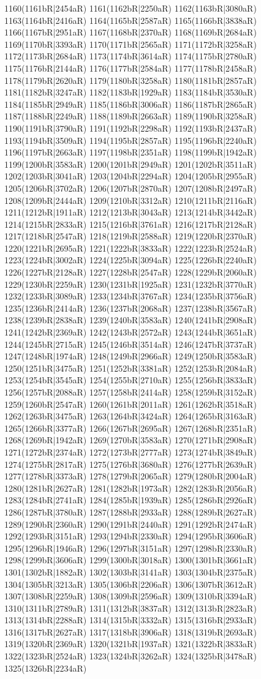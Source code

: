 1160(1161bR|2454aR) 1161(1162bR|2250aR) 1162(1163bR|3080aR) 1163(1164bR|2416aR) 1164(1165bR|2587aR) 1165(1166bR|3838aR) 1166(1167bR|2951aR) 1167(1168bR|2370aR) 1168(1169bR|2684aR) 1169(1170bR|3393aR) 1170(1171bR|2565aR) 1171(1172bR|3258aR) 1172(1173bR|2684aR) 1173(1174bR|3614aR) 1174(1175bR|2780aR) 1175(1176bR|2144aR) 1176(1177bR|2584aR) 1177(1178bR|2458aR) 1178(1179bR|2620aR) 1179(1180bR|3258aR) 1180(1181bR|2857aR) 1181(1182bR|3247aR) 1182(1183bR|1929aR) 1183(1184bR|3530aR) 1184(1185bR|2949aR) 1185(1186bR|3006aR) 1186(1187bR|2865aR) 1187(1188bR|2249aR) 1188(1189bR|2663aR) 1189(1190bR|3258aR) 1190(1191bR|3790aR) 1191(1192bR|2298aR) 1192(1193bR|2437aR) 1193(1194bR|3509aR) 1194(1195bR|2857aR) 1195(1196bR|2240aR) 1196(1197bR|2663aR) 1197(1198bR|2351aR) 1198(1199bR|1942aR) 1199(1200bR|3583aR) 1200(1201bR|2949aR) 1201(1202bR|3511aR) 1202(1203bR|3041aR) 1203(1204bR|2294aR) 1204(1205bR|2955aR) 1205(1206bR|3702aR) 1206(1207bR|2870aR) 1207(1208bR|2497aR) 1208(1209bR|2444aR) 1209(1210bR|3312aR) 1210(1211bR|2116aR) 1211(1212bR|1911aR) 1212(1213bR|3043aR) 1213(1214bR|3442aR) 1214(1215bR|2833aR) 1215(1216bR|3761aR) 1216(1217bR|2128aR) 1217(1218bR|2547aR) 1218(1219bR|2588aR) 1219(1220bR|2370aR) 1220(1221bR|2695aR) 1221(1222bR|3833aR) 1222(1223bR|2524aR) 1223(1224bR|3002aR) 1224(1225bR|3094aR) 1225(1226bR|2240aR) 1226(1227bR|2128aR) 1227(1228bR|2547aR) 1228(1229bR|2060aR) 1229(1230bR|2259aR) 1230(1231bR|1925aR) 1231(1232bR|3770aR) 1232(1233bR|3089aR) 1233(1234bR|3767aR) 1234(1235bR|3756aR) 1235(1236bR|2414aR) 1236(1237bR|2068aR) 1237(1238bR|3567aR) 1238(1239bR|2838aR) 1239(1240bR|3583aR) 1240(1241bR|2908aR) 1241(1242bR|2369aR) 1242(1243bR|2572aR) 1243(1244bR|3651aR) 1244(1245bR|2715aR) 1245(1246bR|3514aR) 1246(1247bR|3737aR) 1247(1248bR|1974aR) 1248(1249bR|2966aR) 1249(1250bR|3583aR) 1250(1251bR|3475aR) 1251(1252bR|3381aR) 1252(1253bR|2084aR) 1253(1254bR|3545aR) 1254(1255bR|2710aR) 1255(1256bR|3833aR) 1256(1257bR|2088aR) 1257(1258bR|2414aR) 1258(1259bR|3152aR) 1259(1260bR|2547aR) 1260(1261bR|2011aR) 1261(1262bR|3518aR) 1262(1263bR|3475aR) 1263(1264bR|3424aR) 1264(1265bR|3163aR) 1265(1266bR|3377aR) 1266(1267bR|2695aR) 1267(1268bR|2351aR) 1268(1269bR|1942aR) 1269(1270bR|3583aR) 1270(1271bR|2908aR) 1271(1272bR|2374aR) 1272(1273bR|2777aR) 1273(1274bR|3849aR) 1274(1275bR|2817aR) 1275(1276bR|3680aR) 1276(1277bR|2639aR) 1277(1278bR|3373aR) 1278(1279bR|2065aR) 1279(1280bR|2004aR) 1280(1281bR|2627aR) 1281(1282bR|1973aR) 1282(1283bR|2056aR) 1283(1284bR|2741aR) 1284(1285bR|1939aR) 1285(1286bR|2926aR) 1286(1287bR|3780aR) 1287(1288bR|2933aR) 1288(1289bR|2627aR) 1289(1290bR|2360aR) 1290(1291bR|2440aR) 1291(1292bR|2474aR) 1292(1293bR|3151aR) 1293(1294bR|2330aR) 1294(1295bR|3606aR) 1295(1296bR|1946aR) 1296(1297bR|3151aR) 1297(1298bR|2330aR) 1298(1299bR|3606aR) 1299(1300bR|3018aR) 1300(1301bR|3661aR) 1301(1302bR|1882aR) 1302(1303bR|3141aR) 1303(1304bR|2375aR) 1304(1305bR|3213aR) 1305(1306bR|2206aR) 1306(1307bR|3612aR) 1307(1308bR|2259aR) 1308(1309bR|2596aR) 1309(1310bR|3394aR) 1310(1311bR|2789aR) 1311(1312bR|3837aR) 1312(1313bR|2823aR) 1313(1314bR|2288aR) 1314(1315bR|3332aR) 1315(1316bR|2933aR) 1316(1317bR|2627aR) 1317(1318bR|3906aR) 1318(1319bR|2693aR) 1319(1320bR|2369aR) 1320(1321bR|1937aR) 1321(1322bR|3833aR) 1322(1323bR|2524aR) 1323(1324bR|3262aR) 1324(1325bR|3478aR) 1325(1326bR|2234aR) 